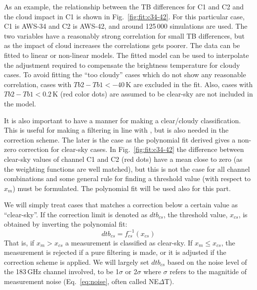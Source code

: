 \documentclass[12pt]{article}
\begin{document}
As an example, the relationship between the TB differences for C1 and C2 and
the cloud impact in C1 is shown in Fig.~\ref{fig:fit:c34-42}. For this
particular case, C1 is AWS-34 and C2 is AWS-42, and around 125\,000 simulations
are used. The two variables have a reasonably strong correlation for small TB
differences, but as the impact of cloud increases the correlations gets poorer.
The data can be fitted to linear or non-linear models. The fitted model can be
used to interpolate the adjustment required to compensate the brightness
temperature for cloudy cases. To avoid fitting the ``too cloudy'' cases which
do not show any reasonable correlation, cases with $Tb2-Tb1< -40$\,K are
excluded in the fit. Also, cases with $Tb2-Tb1 < 0.2$\,K (red color dots) are
assumed to be clear-sky are not included in the model.

It is also important to have a manner for making a clear/cloudy classification.
This is useful for making a filtering in line with \citep{rekha2012potential},
but is also needed in the correction scheme. The later is the case as the
polynomial fit derived gives a non-zero correction for clear-sky cases. In
Fig.~\ref{fig:fit:c34-42} the difference between clear-sky values of channel C1
and C2 (red dots) have a mean close to zero (as the weighting functions are
well matched), but this is not the case for all channel combinations and some
general rule for finding a threshold value (with respect to $x_m$) must be
formulated. The polynomial fit will be used also for this part.


We will simply treat cases that matches a correction below a certain value as
``clear-sky''. If the correction limit is denoted as $dtb_{cs}$, the threshold
value, $x_{cs}$, is obtained by inverting the polynomial fit:
\begin{equation}
dtb_{cs}= f_{cs}^{-1}(x_{cs}) 
\label{eq:dtb}
\end{equation}
That is, if $x_m>x_{cs}$ a measurement is classified as clear-sky. If
$x_m\leq x_{cs}$, the measurement is rejected if a pure filtering is made, or
it is adjusted if the correction scheme is applied. We will largely set
$dtb_{cs}$ based on the noise level of the 183\,GHz channel involved, to be
1$\sigma$ or 2$\sigma$ where $\sigma$ refers to the magnitide of measurement
noise (Eq.~\ref{eq:noise}, often called NE$\Delta$T).
\end{document}
